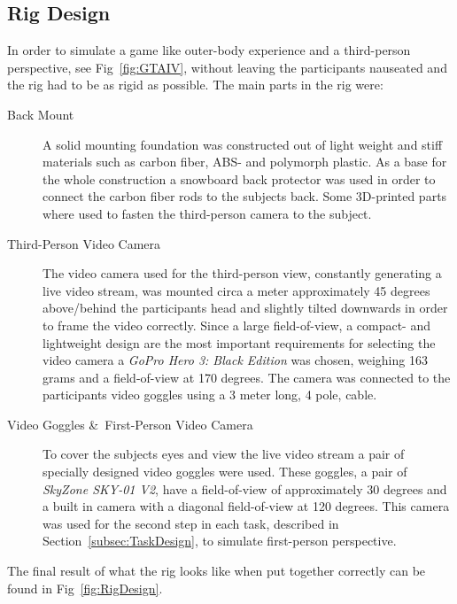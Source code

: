 \documentclass[runningheads,a4paper,oribibl]{llncs}
\begin{document}
\subsection{Rig Design}
In order to simulate a game like outer-body experience and a third-person perspective, see Fig~\ref{fig:GTAIV}, without leaving the participants nauseated and the rig had to be as rigid as possible. The main parts in the rig were:
\begin{description}
	\item[Back Mount] A solid mounting foundation was constructed out of light weight and stiff materials such as carbon fiber, ABS- and polymorph plastic. As a base for the whole construction a snowboard back protector was used in order to connect the carbon fiber rods to the subjects back. Some 3D-printed parts where used to fasten the third-person camera to the subject.

	\item[Third-Person Video Camera] The video camera used for the third-person view, constantly generating a live video stream, was mounted circa a meter approximately 45 degrees above/behind the participants head and slightly tilted downwards in order to frame the video correctly. Since a large field-of-view, a compact- and lightweight design are the most important requirements for selecting the video camera a \emph{GoPro Hero 3: Black Edition} was chosen, weighing 163 grams and a field-of-view at 170 degrees. The camera was connected to the participants video goggles using a 3 meter long, 4 pole, cable.

	\item[Video Goggles \&\ First-Person Video Camera] To cover the subjects eyes and view the live video stream a pair of specially designed video goggles were used. These goggles, a pair of \emph{SkyZone SKY-01 V2}, have a field-of-view of approximately 30 degrees and a built in camera with a diagonal field-of-view at 120 degrees. This camera was used for the second step in each task, described in Section~\ref{subsec:TaskDesign}, to simulate first-person perspective.
\end{description}
The final result of what the rig looks like when put together correctly can be found in Fig~\ref{fig:RigDesign}.
\end{document}

